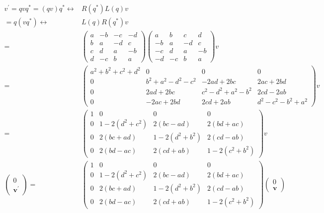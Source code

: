\documentclass[
]{book}
\theoremstyle{definition}
\theoremstyle{definition}
\theoremstyle{definition}
\theoremstyle{definition}
\theoremstyle{remark}
\begin{document}
\[
\begin{aligned}
v^{\prime}=qvq^{*}=\left(qv\right)q^{*}\leftrightarrow & R\left(q^{*}\right)L\left(q\right)v\\
=q\left(vq^{*}\right)\leftrightarrow & L\left(q\right)R\left(q^{*}\right)v\\
= & \begin{pmatrix}a & -b & -c & -d\\
b & a & -d & c\\
c & d & a & -b\\
d & -c & b & a
\end{pmatrix}\begin{pmatrix}a & b & c & d\\
-b & a & -d & c\\
-c & d & a & -b\\
-d & -c & b & a
\end{pmatrix}v\\
= & \begin{pmatrix}a^{2}+b^{2}+c^{2}+d^{2} & 0 & 0 & 0\\
0 & b^{2}+a^{2}-d^{2}-c^{2} & -2ad+2bc & 2ac+2bd\\
0 & 2ad+2bc & c^{2}-d^{2}+a^{2}-b^{2} & 2cd-2ab\\
0 & -2ac+2bd & 2cd+2ab & d^{2}-c^{2}-b^{2}+a^{2}
\end{pmatrix}v\\
= & \begin{pmatrix}1 & 0 & 0 & 0\\
0 & 1-2\left(d^{2}+c^{2}\right) & 2\left(bc-ad\right) & 2\left(bd+ac\right)\\
0 & 2\left(bc+ad\right) & 1-2\left(d^{2}+b^{2}\right) & 2\left(cd-ab\right)\\
0 & 2\left(bd-ac\right) & 2\left(cd+ab\right) & 1-2\left(c^{2}+b^{2}\right)
\end{pmatrix}v\\
\begin{pmatrix}0\\
\boldsymbol{v}^{\prime}
\end{pmatrix}= & \begin{pmatrix}1 & 0 & 0 & 0\\
0 & 1-2\left(d^{2}+c^{2}\right) & 2\left(bc-ad\right) & 2\left(bd+ac\right)\\
0 & 2\left(bc+ad\right) & 1-2\left(d^{2}+b^{2}\right) & 2\left(cd-ab\right)\\
0 & 2\left(bd-ac\right) & 2\left(cd+ab\right) & 1-2\left(c^{2}+b^{2}\right)
\end{pmatrix}\begin{pmatrix}0\\
\boldsymbol{v}
\end{pmatrix}
\end{aligned}
\]
\end{document}
